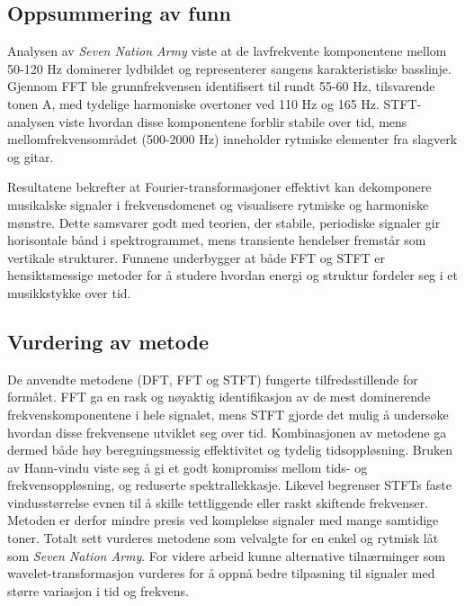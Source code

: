 


\subsection{Oppsummering av funn}
Analysen av \textit{Seven Nation Army} viste at de lavfrekvente komponentene mellom 50-120 Hz dominerer lydbildet 
og representerer sangens karakteristiske basslinje. Gjennom FFT ble grunnfrekvensen identifisert til rundt 55-60 Hz, 
tilsvarende tonen A, med tydelige harmoniske overtoner ved 110 Hz og 165 Hz. STFT-analysen viste hvordan disse 
komponentene forblir stabile over tid, mens mellomfrekvensområdet (500-2000 Hz) inneholder rytmiske elementer fra 
slagverk og gitar.

Resultatene bekrefter at Fourier-transformasjoner effektivt kan dekomponere musikalske signaler i frekvensdomenet og visualisere rytmiske og 
harmoniske mønstre. Dette samsvarer godt med teorien, der stabile, periodiske signaler gir horisontale bånd i spektrogrammet, 
mens transiente hendelser fremstår som vertikale strukturer. Funnene underbygger at både FFT og STFT er hensiktsmessige metoder for å 
studere hvordan energi og struktur fordeler seg i et musikkstykke over tid.


\subsection{Vurdering av metode}
De anvendte metodene (DFT, FFT og STFT) fungerte tilfredsstillende for formålet. FFT ga en rask og nøyaktig identifikasjon
av de mest dominerende frekvenskomponentene i hele signalet, mens STFT gjorde det mulig å undersøke hvordan disse frekvensene 
utviklet seg over tid. Kombinasjonen av metodene ga dermed både høy beregningsmessig effektivitet og tydelig tidsoppløsning.
Bruken av Hann-vindu viste seg å gi et godt kompromiss mellom tids- og frekvensoppløsning, og reduserte spektrallekkasje. Likevel 
begrenser STFTs faste vindusstørrelse evnen til å skille tettliggende eller raskt skiftende frekvenser. Metoden er derfor mindre 
presis ved komplekse signaler med mange samtidige toner.
Totalt sett vurderes metodene som velvalgte for en enkel og rytmisk låt som \textit{Seven Nation Army}. 
For videre arbeid kunne alternative tilnærminger som wavelet-transformasjon vurderes for å oppnå bedre tilpasning til signaler med 
større variasjon i tid og frekvens.



